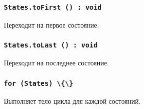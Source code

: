 \subsubsection{\lstinline|States.toFirst () : void|}

Переходит на первое состояние.

\subsubsection{\lstinline|States.toLast () : void|}

Переходит на последнее состояние.

\subsubsection{\lstinline|for (States) \{\}|}

Выполняет тело цикла для каждой состояний.

